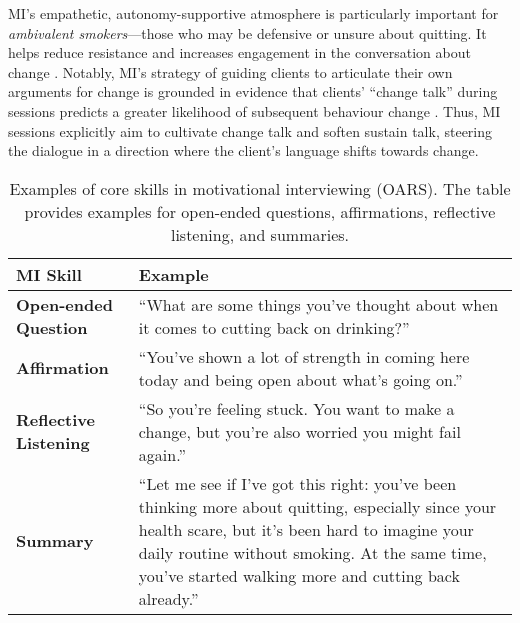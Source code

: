 MI's empathetic, autonomy-supportive atmosphere is particularly important for \emph{ambivalent smokers}---those who may be defensive or unsure about quitting. It helps reduce resistance and increases engagement in the conversation about change \cite{Miller1983, MillerRollnick2023}. Notably, MI's strategy of guiding clients to articulate their own arguments for change is grounded in evidence that clients' ``change talk'' during sessions predicts a greater likelihood of subsequent behaviour change \cite{MillerRose2009}. Thus, MI sessions explicitly aim to cultivate change talk and soften sustain talk, steering the dialogue in a direction where the client's language shifts towards change.



\begin{table}[ht!]
\centering
\begin{tabular}{@{} p{} p{} @{}}
\toprule
\textbf{MI Skill} & \textbf{Example} \\
\midrule
\textbf{Open-ended Question} & 
``What are some things you've thought about when it comes to cutting back on drinking?'' \\
\addlinespace
\textbf{Affirmation} & 
``You've shown a lot of strength in coming here today and being open about what’s going on.'' \\
\addlinespace
\textbf{Reflective Listening} & 
``So you're feeling stuck. You want to make a change, but you're also worried you might fail again.'' \\
\addlinespace
\textbf{Summary} & 
``Let me see if I've got this right: you've been thinking more about quitting, especially since your health scare, but it's been hard to imagine your daily routine without smoking. At the same time, you’ve started walking more and cutting back already.'' \\
\bottomrule
\end{tabular}
\caption[Examples of MI skills]{Examples of core skills in motivational interviewing (OARS). The table provides examples for open-ended questions, affirmations, reflective listening, and summaries.}
\label{tab:mi_skill_examples}
\end{table}




